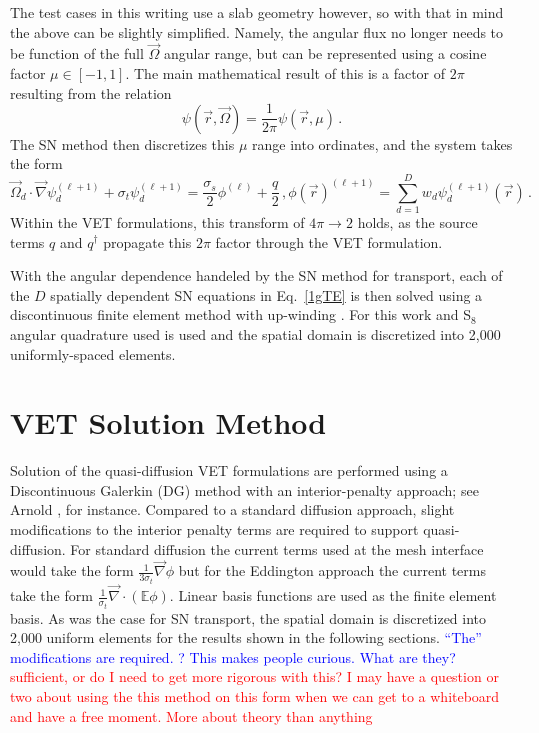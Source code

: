 \documentclass[12pt]{report}
\newcommand{\vr}{\vec{r}}
\newcommand{\vO}{\vec{\Omega}}
\renewcommand{\div}{\vec{\nabla} \cdot}
\newcommand{\grad}{\vec{\nabla}}
\newcommand{\Edd}{\mathbb{E}}
\newcommand{\sigt}{\sigma_t}
\newcommand{\sigs}{\sigma_s}
\newcommand{\comment}[2]{\marginpar{\textcolor{#2}{$\star$}}\textcolor{#2}{#1}\newline}
\newcommand{\iwh}[1]{\comment{#1}{red}}
\newcommand{\jcr}[1]{\comment{#1}{blue}}
\newcommand{\iwh}[1]{\phantom{a}}
\newcommand{\jcr}[1]{\phantom{a}}
\begin{document}
The test cases in this writing use a slab geometry however, so with that in mind the above can be slightly simplified. Namely, the angular flux no longer needs to be function of the full $\vO$ angular range, but can be represented using a cosine factor $\mu \in [-1,1]$. The main mathematical result of this is a factor of $2 \pi$ resulting from the relation 
\begin{equation}
\psi(\vr,\vO)=\frac{1}{2 \pi} \psi(\vr,\mu) \, .
\end{equation} 
The SN method then discretizes this $\mu$ range into ordinates, and the system takes the form
\begin{subequations}
\begin{equation}
\label{1gTEmu}
\vO_d \cdot \grad \psi_d^{(\ell+1)} + \sigt \psi_d^{(\ell+1)} = \frac{\sigs}{2} \phi^{(\ell)} + \frac{q}{2}\,,
\end{equation}
\begin{equation}
\phi(\vr)^{(\ell+1)} = \sum_{d=1}^D w_d \psi_d^{(\ell+1)}(\vr) \,.
\end{equation}
\end{subequations}
Within the VET formulations, this transform of $4 \pi \to 2$ holds, as the source terms $q$ and $q^\dag$ propagate this $2 \pi$ factor through the VET formulation.

With the angular dependence handeled by the SN method for transport, each of the $D$ spatially dependent SN equations in Eq.~\eqref{1gTE} is then solved using a discontinuous finite element method with up-winding \cite{ReedHill}. For this work and S$_8$ angular quadrature used is used and the spatial domain is discretized into 2,000 uniformly-spaced elements.



\section{VET Solution Method}
Solution of the quasi-diffusion VET formulations are performed using a Discontinuous Galerkin (DG) method with an interior-penalty approach; see Arnold \cite{Arnold}, for instance. Compared to a standard diffusion approach, slight modifications to the interior penalty terms are required to support quasi-diffusion. For standard diffusion the current terms used at the mesh interface would take the form $\frac{1}{3 \sigt} \grad \phi$ but for the Eddington approach the current terms take the form $\frac{1}{\sigt} \div ( \Edd \phi)$. Linear basis functions are used as the finite element basis. As was the case for SN transport, the spatial domain is discretized into 2,000 uniform elements for the results shown in the following sections.
\jcr{``The'' modifications are required. ? This makes people curious. What are they?}
\iwh{sufficient, or do I need to get more rigorous with this? I may have a question or two about using the this method on this form when we can get to a whiteboard and have a free moment. More about theory than anything}
\end{document}
